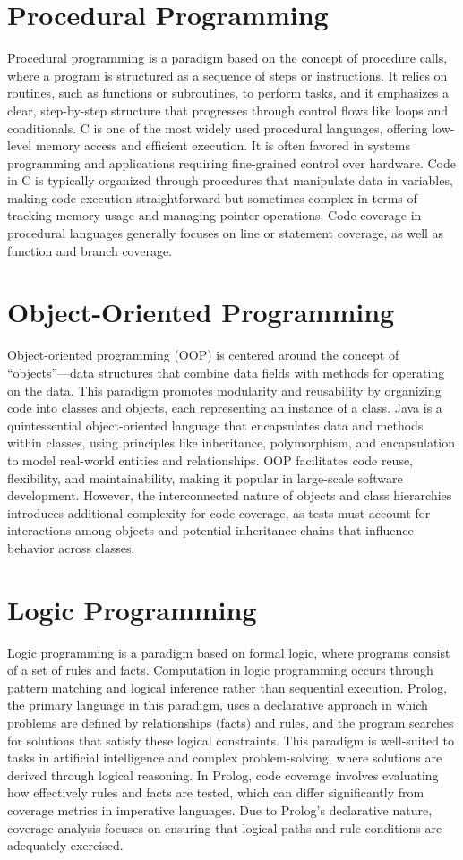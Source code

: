 \documentclass[sigconf]{acmart}
\begin{document}
\section{Procedural Programming}
Procedural programming is a paradigm based on the concept of procedure calls, where a program is structured as a sequence of steps or instructions. It relies on routines, such as functions or subroutines, to perform tasks, and it emphasizes a clear, step-by-step structure that progresses through control flows like loops and conditionals. C is one of the most widely used procedural languages, offering low-level memory access and efficient execution. It is often favored in systems programming and applications requiring fine-grained control over hardware. Code in C is typically organized through procedures that manipulate data in variables, making code execution straightforward but sometimes complex in terms of tracking memory usage and managing pointer operations. Code coverage in procedural languages generally focuses on line or statement coverage, as well as function and branch coverage.

\section{Object-Oriented Programming}
Object-oriented programming (OOP) is centered around the concept of “objects”—data structures that combine data fields with methods for operating on the data. This paradigm promotes modularity and reusability by organizing code into classes and objects, each representing an instance of a class. Java is a quintessential object-oriented language that encapsulates data and methods within classes, using principles like inheritance, polymorphism, and encapsulation to model real-world entities and relationships. OOP facilitates code reuse, flexibility, and maintainability, making it popular in large-scale software development. However, the interconnected nature of objects and class hierarchies introduces additional complexity for code coverage, as tests must account for interactions among objects and potential inheritance chains that influence behavior across classes.

\section{Logic Programming}
Logic programming is a paradigm based on formal logic, where programs consist of a set of rules and facts. Computation in logic programming occurs through pattern matching and logical inference rather than sequential execution. Prolog, the primary language in this paradigm, uses a declarative approach in which problems are defined by relationships (facts) and rules, and the program searches for solutions that satisfy these logical constraints. This paradigm is well-suited to tasks in artificial intelligence and complex problem-solving, where solutions are derived through logical reasoning. In Prolog, code coverage involves evaluating how effectively rules and facts are tested, which can differ significantly from coverage metrics in imperative languages. Due to Prolog’s declarative nature, coverage analysis focuses on ensuring that logical paths and rule conditions are adequately exercised.
\end{document}
